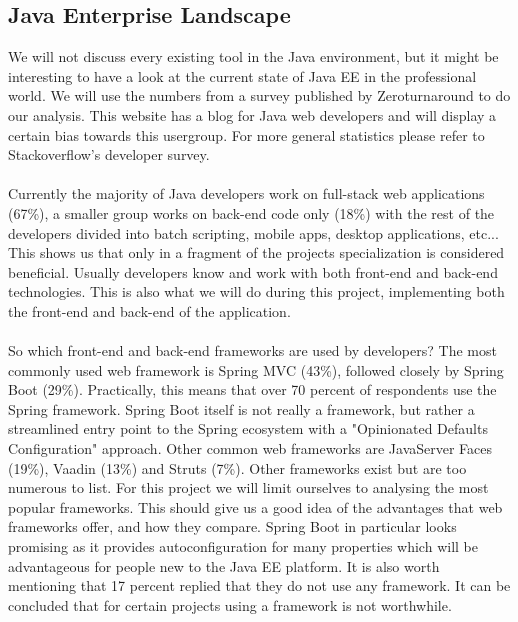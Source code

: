 \documentclass[12pt]{article}
\begin{document}
\begin{multicols}{2}
\subsection{Java Enterprise Landscape}\label{sec:javalandscape}
We will not discuss every existing tool in the Java environment, but it might be interesting to have a look at the current state of Java EE in the professional world. We will use the numbers from a survey published by Zeroturnaround to do our analysis.\cite{JavaEELandscape73:online} This website has a blog for Java web developers and will display a certain bias towards this usergroup. For more general statistics please refer to Stackoverflow's developer survey. \cite{DeveloperSurvey95:online}
\\\\
Currently the majority of Java developers work on full-stack web applications (67\%), a smaller group works on back-end code only (18\%) with the rest of the developers divided into batch scripting, mobile apps, desktop applications, etc... This shows us that only in a fragment of the projects specialization is considered beneficial. Usually developers know and work with both front-end and back-end technologies. This is also what we will do during this project, implementing both the front-end and back-end of the application.
\\\\
So which front-end and back-end frameworks are used by developers? The most commonly used web framework is Spring MVC (43\%), followed closely by Spring Boot (29\%). Practically, this means that over 70 percent of respondents use the Spring framework. Spring Boot itself is not really a framework, but rather a streamlined entry point to the Spring ecosystem with a "Opinionated Defaults Configuration" approach. \cite{SpringBootAdvantages67:online}\cite{SpringBootIntro23:online} Other common web frameworks are JavaServer Faces (19\%), Vaadin (13\%) and Struts (7\%). Other frameworks exist but are too numerous to list. For this project we will limit ourselves to analysing the most popular frameworks. This should give us a good idea of the advantages that web frameworks offer, and how they compare. Spring Boot in particular looks promising as it provides autoconfiguration for many properties which will be advantageous for people new to the Java EE platform. It is also worth mentioning that 17 percent replied that they do not use any framework. It can be concluded that for certain projects using a framework is not worthwhile. %

\end{multicols}
\end{document}
